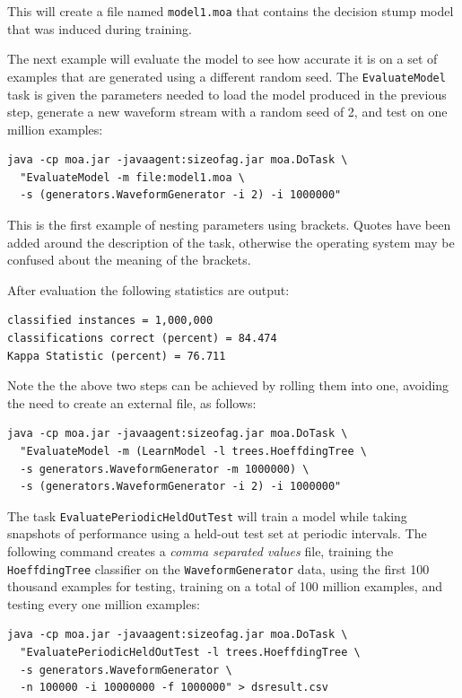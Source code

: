 \documentclass[a4paper,12pt]{article}
\begin{document}
This will create a file named \verb+model1.moa+ that contains the decision stump model that was induced during training.

The next example will evaluate the model to see how accurate it is on a set of examples that are generated using a different random seed. The \verb+EvaluateModel+ task is given the parameters needed to load the model produced in the previous step, generate a new waveform stream with a random seed of 2, and test on one million examples:

\begin{verbatim}
java -cp moa.jar -javaagent:sizeofag.jar moa.DoTask \
  "EvaluateModel -m file:model1.moa \
  -s (generators.WaveformGenerator -i 2) -i 1000000"
\end{verbatim}

This is the first example of nesting parameters using brackets. Quotes have been added around the description of the task, otherwise the operating system may be confused about the meaning of the brackets.

After evaluation the following statistics are output:

\begin{verbatim}
classified instances = 1,000,000
classifications correct (percent) = 84.474
Kappa Statistic (percent) = 76.711
\end{verbatim}

Note the the above two steps can be achieved by rolling them into one, avoiding the need to create an external file, as follows:

\begin{verbatim}
java -cp moa.jar -javaagent:sizeofag.jar moa.DoTask \
  "EvaluateModel -m (LearnModel -l trees.HoeffdingTree \
  -s generators.WaveformGenerator -m 1000000) \
  -s (generators.WaveformGenerator -i 2) -i 1000000"
\end{verbatim}

The task \verb+EvaluatePeriodicHeldOutTest+ will train a model while taking snapshots of performance using a held-out test set at periodic intervals.
The following command creates a {\em comma separated values} file, training the \verb+HoeffdingTree+ classifier on the \verb+WaveformGenerator+ data, using the first 100 thousand examples for testing, training on a total of 100 million examples, and testing every one million examples:

\begin{verbatim}
java -cp moa.jar -javaagent:sizeofag.jar moa.DoTask \
  "EvaluatePeriodicHeldOutTest -l trees.HoeffdingTree \
  -s generators.WaveformGenerator \
  -n 100000 -i 10000000 -f 1000000" > dsresult.csv
\end{verbatim}
\end{document}
